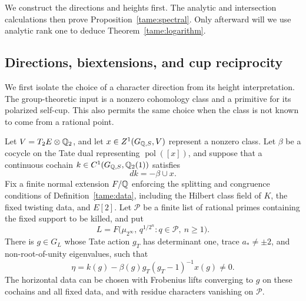 We construct the directions and heights first. The analytic and
intersection calculations then prove Proposition~\ref{tame:spectral}.
Only afterward will we use analytic rank one to deduce
Theorem~\ref{tame:logarithm}.

\subsection{Directions, biextensions, and cup reciprocity}

We first isolate the choice of a character direction from its height
interpretation. The group-theoretic input is a nonzero cohomology class
and a primitive for its polarized self-cup. This also permits the same
choice when the class is not known to come from a rational point.

\begin{lemma}
\label{tame:cochain-direction}
Let \(V=T_2E\otimes\mathbb Q_2\), and let
\(x\in Z^1(G_{\mathbb Q,S},V)\) represent a nonzero class. Let \(\beta\)
be a cocycle on the Tate dual representing \(\operatorname{pol}([x])\),
and suppose that a continuous
cochain \(k\in C^1(G_{\mathbb Q,S},\mathbb Q_2(1))\) satisfies
\[
                         dk=-\beta\cup x.
\]
Fix a finite normal extension \(F/\mathbb Q\) enforcing the splitting and
congruence conditions of Definition~\ref{tame:data}, including the
Hilbert class field of \(K\), the fixed twisting data, and \(E[2]\).
Let \(\mathcal P\) be a finite list of rational primes containing the
fixed support to be killed, and put
\[
 L=F\bigl(\mu_{2^\infty},\,q^{1/2^n}:q\in\mathcal P,\ n\ge1\bigr).
\]
There is \(g\in G_L\) whose Tate action \(g_T\) has determinant one,
trace \(a_*\ne\pm2\), and non-root-of-unity eigenvalues, such that
\begin{equation}\label{tame:eta}
 \eta=k(g)-\beta(g)g_T(g_T-1)^{-1}x(g)\ne0.
\end{equation}
The horizontal data can be chosen with Frobenius lifts converging to
\(g\) on these cochains and all fixed data, and with residue characters
vanishing on \(\mathcal P\).
\end{lemma}

